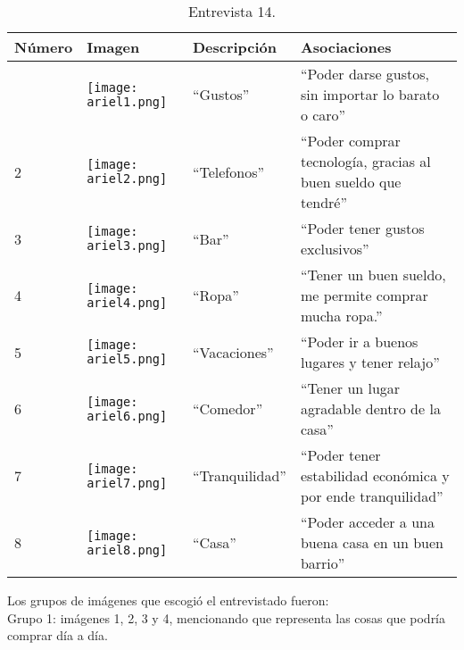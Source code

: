 \begin{table}[H]
\centering
\begin{tabular}{>{\centering\arraybackslash}m{1cm} >{\centering\arraybackslash}m{2cm} >{\arraybackslash}m{5cm}>{\arraybackslash}m{5cm}}
\hline
Número  & Imagen & Descripción & Asociaciones \\
\hline \hline

1 & \texttt{[image: ariel1.png]} & ``Gustos'' & ``Poder darse gustos, sin importar lo barato o caro'' \\
\hline

2 & \texttt{[image: ariel2.png]} & ``Telefonos'' & ``Poder comprar tecnología, gracias al buen sueldo que tendré'' \\
\hline

3 & \texttt{[image: ariel3.png]} & ``Bar'' & ``Poder tener gustos exclusivos'' \\
\hline

4 & \texttt{[image: ariel4.png]} & ``Ropa'' & ``Tener un buen sueldo, me permite comprar mucha ropa.'' \\
\hline

5 & \texttt{[image: ariel5.png]} & ``Vacaciones'' & ``Poder ir a buenos lugares y tener relajo'' \\
\hline

6 & \texttt{[image: ariel6.png]} & ``Comedor'' & ``Tener un lugar agradable dentro de la casa'' \\
\hline

7 & \texttt{[image: ariel7.png]} & ``Tranquilidad'' & ``Poder tener estabilidad económica y por ende tranquilidad'' \\
\hline

8 & \texttt{[image: ariel8.png]} & ``Casa'' & ``Poder acceder a una buena casa en un buen barrio'' \\
\hline

\end{tabular}
\caption{Entrevista 14.}
\label{tabla:ariel}
\end{table}

Los grupos de imágenes que escogió el entrevistado fueron:\\

Grupo 1: imágenes 1, 2, 3 y 4, mencionando que representa las cosas que podría comprar día a día.\\

